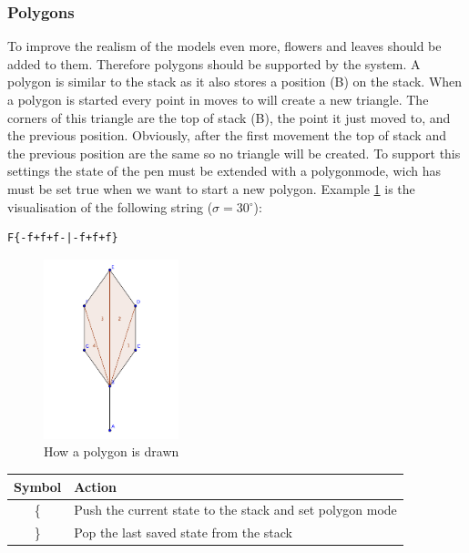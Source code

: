 \documentclass[11pt,a4paper]{article}
\newcommand{\degree}{\ensuremath{^\circ}}
\begin{document}
\subsubsection{Polygons}
To improve the realism of the models even more, flowers and leaves should be added to them. Therefore polygons should be supported by the system. A polygon is similar to the stack as it also stores a position (B) on the stack. When a polygon is started every point in moves to will create a new triangle. The corners of this triangle are the top of stack (B), the point it just moved to, and the previous position. Obviously, after the first movement the top of stack and the previous position are the same so no triangle will be created. To support this settings the state of the pen must be extended with a polygonmode, wich has must be set true when we want to start a new polygon. Example \ref{fig:polygon} is the visualisation of the following string ($\sigma = 30\degree$):
\begin{verbatim}
F{-f+f+f-|-f+f+f}
\end{verbatim}


\begin{figure}[h!]
  \centering
  \includegraphics[width=0.35\textwidth]{polygons.pdf}
  \caption{How a polygon is drawn}
  \label{fig:polygon}
\end{figure}

\begin{center}
\begin{tabular}{c | l}
Symbol & Action \\ \hline
\{ & Push the current state to the stack and set polygon mode \\
\} & Pop the last saved state from the stack \\
\end{tabular}
\end{center}

\end{document}
